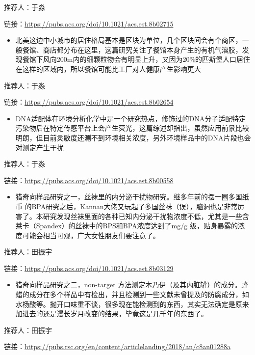 \documentclass[]{book}
\providecommand{\tightlist}{%
  \setlength{\itemsep}{0pt}\setlength{\parskip}{0pt}}
\begin{document}
推荐人：于淼

链接：\url{https://pubs.acs.org/doi/10.1021/acs.est.8b02715}

\begin{itemize}
\tightlist
\item
  北美这边中小城市的居住格局基本是区块为单位，几个区块间会有个商区，一般餐馆、商店都分布在这里，这篇研究关注了餐馆本身产生的有机气溶胶，发现餐馆下风向200m内的细颗粒物会有明显上升，又因为20\%的匹斯堡人口居住在这样的区域内，所以餐馆可能比工厂对人健康产生影响更大
\end{itemize}

推荐人：于淼

链接：\url{https://pubs.acs.org/doi/10.1021/acs.est.8b02654}

\begin{itemize}
\tightlist
\item
  DNA适配体在环境分析化学中是一个研究热点，修饰过的DNA分子适配特定污染物后在特定传感平台上会产生荧光，这篇综述却指出，虽然应用前景比较明朗，但目前灵敏度还测不到环境相关浓度，另外环境样品中的DNA片段也会对测定产生干扰
\end{itemize}

推荐人：于淼

链接：\url{https://pubs.acs.org/doi/10.1021/acs.est.8b00558}

\begin{itemize}
\tightlist
\item
  猎奇向样品研究之一，丝袜里的内分泌干扰物研究。继多年前的摆一圈多国纸币 的BPA研究之后，Kannan大佬又玩起了多国丝袜（误），脑洞也是非常厉害了。本研究发现丝袜里面的各种已知内分泌干扰物浓度不低，尤其是一些含莱卡（Spandex）的丝袜中的BPS和BPA浓度达到了mg/g 级，贴身暴露的浓度可能会相当可观，广大女性朋友们要注意了。
\end{itemize}

推荐人：田振宇

链接：\url{https://pubs.acs.org/doi/10.1021/acs.est.8b03129}

\begin{itemize}
\tightlist
\item
  猎奇向样品研究之二，non-target 方法测定木乃伊（及其内脏罐）的成分。蜂蜡的成分在多个样品中有检出，并且检测到一些文献未曾提及的防腐成分，如水杨酸等。抛开口味重不谈，很多现在能检测到的东西，其实无法确定是原来加进去的还是漫长岁月改变的结果，毕竟这是几千年的东西了。
\end{itemize}

推荐人：田振宇

链接：\url{https://pubs.rsc.org/en/content/articlelanding/2018/an/c8an01288a}
\end{document}
